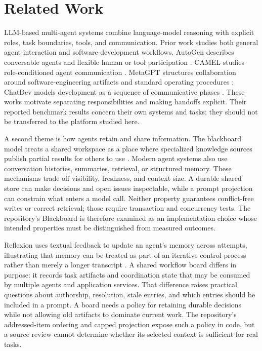 \documentclass[12pt,onecolumn,draftclsnofoot]{IEEEtran}
\begin{document}
\section{Related Work}
LLM-based multi-agent systems combine language-model reasoning with explicit roles, task boundaries, tools, and communication. Prior work studies both general agent interaction and software-development workflows. AutoGen describes conversable agents and flexible human or tool participation \cite{wu2023autogen}. CAMEL studies role-conditioned agent communication \cite{li2023camel}. MetaGPT structures collaboration around software-engineering artifacts and standard operating procedures \cite{hong2024metagpt}; ChatDev models development as a sequence of communicative phases \cite{qian2024communicative}. These works motivate separating responsibilities and making handoffs explicit. Their reported benchmark results concern their own systems and tasks; they should not be transferred to the platform studied here.

A second theme is how agents retain and share information. The blackboard model treats a shared workspace as a place where specialized knowledge sources publish partial results for others to use \cite{nii1986blackboard}. Modern agent systems also use conversation histories, summaries, retrieval, or structured memory. These mechanisms trade off visibility, freshness, and context size. A durable shared store can make decisions and open issues inspectable, while a prompt projection can constrain what enters a model call. Neither property guarantees conflict-free writes or correct retrieval; those require transaction and concurrency tests. The repository's Blackboard is therefore examined as an implementation choice whose intended properties must be distinguished from measured outcomes.

Reflexion uses textual feedback to update an agent's memory across attempts, illustrating that memory can be treated as part of an iterative control process rather than merely a longer transcript \cite{shinn2023reflexion}. A shared workflow board differs in purpose: it records task artifacts and coordination state that may be consumed by multiple agents and application services. That difference raises practical questions about authorship, resolution, stale entries, and which entries should be included in a prompt. A board needs a policy for retaining durable decisions while not allowing old artifacts to dominate current work. The repository's addressed-item ordering and capped projection expose such a policy in code, but a source review cannot determine whether its selected context is sufficient for real tasks.
\end{document}
